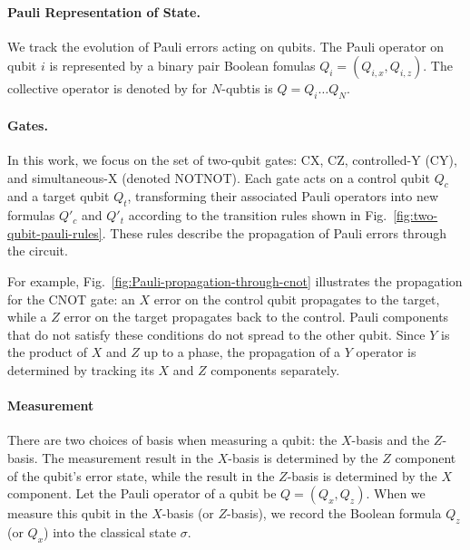 \documentclass[acmsmallw,review]{acmart}
\newcommand{\yfc}[1]{}
\newcommand{\cy}[1]{}
\begin{document}
\paragraph{\textbf{Pauli Representation of State.}}


We track the evolution of Pauli errors acting on qubits. 
The Pauli operator on qubit $i$ is represented by a binary pair Boolean fomulas $Q_i = (Q_{i,x}, Q_{i,z}) $. The collective operator is denoted  by for $N$-qubtis  is $Q = Q_i \dots Q_N$. 


\cy{tracking the evolution of Pauli propagation is conventional }

\paragraph{\textbf{Gates.}}
In this work, we focus on the set of two-qubit gates: CX, CZ, controlled-Y (CY),  and simultaneous-X (denoted NOTNOT).  
Each gate acts on a control qubit $Q_c$ and a target qubit $Q_t$, transforming their associated Pauli operators into new formulas $Q'_c$ and $Q'_t$ according to the transition rules shown in Fig.~\ref{fig:two-qubit-pauli-rules}.  
These rules describe the propagation of Pauli errors through the circuit.  

For example, Fig.~\ref{fig:Pauli-propagation-through-cnot} illustrates the propagation for the CNOT gate: an $X$ error on the control qubit propagates to the target, while a $Z$ error on the target propagates back to the control. Pauli components that do not satisfy these conditions do not spread to the other qubit.  
Since $Y$ is the product of $X$ and $Z$ up to a phase, the propagation of a $Y$ operator is determined by tracking its $X$ and $Z$ components separately.

\cy{what is NOTNOT?}
\cy{CY is a complicated gate; it involves an additional phase. try to avoid the use of CY}

\paragraph{\textbf{Measurement}}
There are two choices of basis when measuring a qubit: the $X$-basis and the $Z$-basis. The measurement result in the $X$-basis is determined by the $Z$ component of the qubit's error state, while the result in the $Z$-basis is determined by the $X$ component. 
Let the Pauli operator of a qubit be $Q = (Q_x, Q_z)$. When we measure this qubit in the $X$-basis (or $Z$-basis), we record the Boolean formula $Q_z$ (or $Q_x$) into the classical state $\sigma$.
\end{document}
